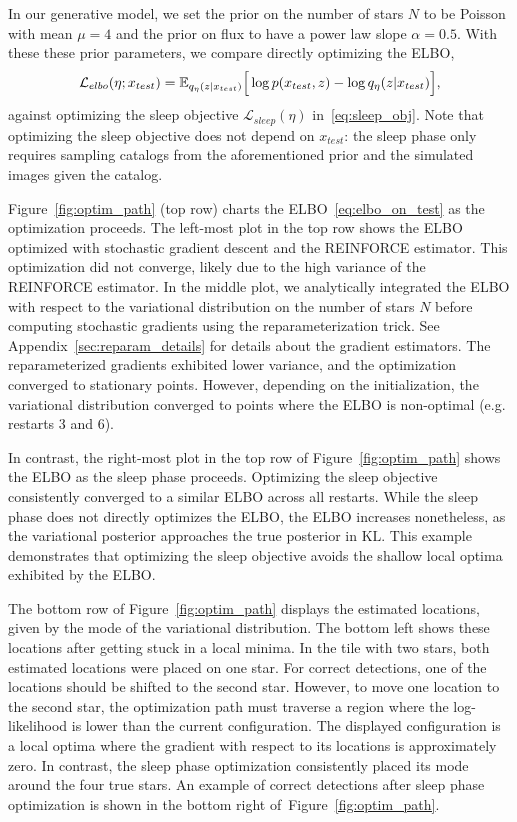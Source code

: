 In our generative model, we set the prior on the number of stars $N$ to be Poisson with mean $\mu = 4$ and the prior on flux to have a power law slope $\alpha = 0.5$. 
With these these prior parameters, we compare directly optimizing the ELBO, 
\begin{align}
\mathcal{L}_{elbo}(\eta; x_{test}) = \mathbb{E}_{q_{\eta}(z | x_{test})}\Big[\log p(x_{test}, z) - \log q_{\eta}(z | x_{test})\Big],
\label{eq:elbo_on_test}
\end{align}
against optimizing the sleep objective $\mathcal{L}_{sleep}(\eta)$ in~\eqref{eq:sleep_obj}. Note that optimizing the sleep objective does not depend on $x_{test}$: the sleep phase only requires sampling catalogs from the aforementioned prior and the simulated images given the catalog. 

Figure~\ref{fig:optim_path} (top row) charts the ELBO~\eqref{eq:elbo_on_test} as the optimization proceeds.
The left-most plot in the top row shows the ELBO optimized with stochastic gradient descent and the REINFORCE estimator.
This optimization did not converge, likely due to the high variance of the REINFORCE estimator. 
In the middle plot, we analytically integrated the ELBO with respect to the variational distribution on the number of stars $N$ before computing stochastic gradients using the reparameterization trick.
See Appendix~\ref{sec:reparam_details} for details about the gradient estimators. 
The reparameterized gradients exhibited lower variance, and the optimization converged to stationary points. 
However, depending on the initialization, the variational distribution converged to points where the ELBO is non-optimal (e.g. restarts 3 and 6). 

In contrast, the right-most plot in the top row of Figure~\ref{fig:optim_path} shows the ELBO as the sleep phase proceeds. 
Optimizing the sleep objective consistently converged to a similar ELBO across all restarts. 
While the sleep phase does not directly optimizes the ELBO, the ELBO increases nonetheless, as the variational posterior approaches the true posterior in $\textrm{KL}$. 
This example demonstrates that optimizing the sleep objective avoids the shallow local optima exhibited by the ELBO. 

The bottom row of Figure~\ref{fig:optim_path} displays the estimated locations, given by the mode of the variational distribution. 
The bottom left shows these locations after getting stuck in a local minima. 
In the tile with two stars, both estimated locations were placed on one star. 
For correct detections, one of the locations should be shifted to the second star. 
However, to move one location to the second star, the optimization path must traverse a region where the log-likelihood is lower than the current configuration. 
The displayed configuration is a local optima where the gradient with respect to its locations is approximately zero.
In contrast, the sleep phase optimization consistently placed its mode around the four true stars. 
An example of correct detections after sleep phase optimization is shown in the bottom right of~Figure~\ref{fig:optim_path}.

